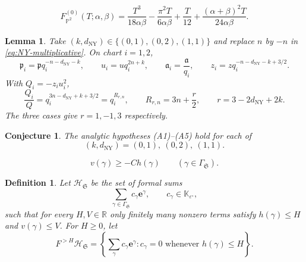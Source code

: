 \documentclass[10pt,a4paper]{amsart}
\newtheorem{conjecture}{Conjecture}
\newtheorem{lemma}{Lemma}
\newtheorem{definition}{Definition}
\newcommand{\K}{\mathbb K}
\newcommand{\eps}{\varepsilon}
\begin{document}
\begin{equation}
 F_{\mathbb P^2}^{(0)}(T;\alpha,\beta)
 =\frac{T^3}{18\alpha\beta}
 -\frac{\pi^2T}{6\alpha\beta}+\frac{T}{12}
 +\frac{(\alpha+\beta)^2T}{24\alpha\beta}.
\label{eq:P2-degree-zero-polynomial}
\end{equation}

\begin{lemma}
\label{lem:NY-chart-substitutions}
Take \((k,d_{\mathrm{NY}})\in\{(0,1),(0,2),(1,1)\}\) and replace \(n\) by \(-n\) in \eqref{eq:NY-multiplicative}.  On chart \(i=1,2\),
\begin{equation}
 \mathfrak p_i=\mathfrak p q_i^{-n-d_{\mathrm{NY}}-k},\qquad
 u_i=uq_i^{2n+k},\qquad
 \mathfrak a_i=\frac{\mathfrak a}{q_i},\qquad
 z_i=zq_i^{-n-d_{\mathrm{NY}}-k+3/2}.
\label{eq:NY-chart-substitutions}
\end{equation}
With \(Q_i=-z_i u_i^2\),
\begin{equation}
 \frac{Q_i}{Q}
 =q_i^{3n-d_{\mathrm{NY}}+k+3/2}
 =q_i^{R_{r,n}},
 \qquad
 R_{r,n}=3n+\frac r2,\qquad r=3-2d_{\mathrm{NY}}+2k.
\label{eq:NY-plane-shift}
\end{equation}
The three cases give \(r=1,-1,3\) respectively.
\end{lemma}

\begin{conjecture}
\label{conj:P2-asymptotic-resummation}
The analytic hypotheses \textup{(A1)--(A5)} hold for each of
\[
 (k,d_{\mathrm{NY}})=(0,1),\ (0,2),\ (1,1).
\]
\end{conjecture}

\begin{equation}
 v(\gamma)\geq-Ch(\gamma)
 \qquad(\gamma\in\Gamma_{\mathfrak S}).
\label{eq:semigroup-cone-bound}
\end{equation}

\begin{definition}
\label{def:completed-semigroup-algebra}
Let \(\mathscr H_{\mathfrak S}\) be the set of formal sums
\begin{equation}
 \sum_{\gamma\in\Gamma_{\mathfrak S}}c_\gamma \mathbf e^\gamma,
 \qquad c_\gamma\in\K_{\eps^\circ},
\label{eq:completed-semigroup-algebra}
\end{equation}
such that for every \(H,V\in\mathbb R\) only finitely many nonzero terms satisfy \(h(\gamma)\leq H\) and \(v(\gamma)\leq V\).  For \(H\geq0\), let
\[
 F^{>H}\mathscr H_{\mathfrak S}
 =\left\{\sum_\gamma c_\gamma \mathbf e^\gamma:
 c_\gamma=0\text{ whenever }h(\gamma)\leq H\right\}.
\]
\end{definition}
\end{document}
